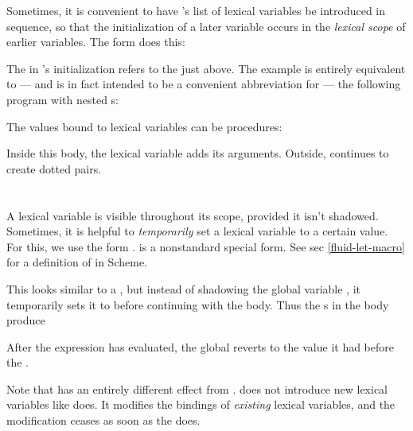 Sometimes, it is convenient to have 's list of
lexical variables be introduced in sequence, so that
the initialization of a later variable occurs in the
{\em lexical scope} of earlier variables.   The form
 does this:


\n The  in 's initialization refers to the 
just above.  The example is entirely equivalent to ---
and is in fact intended to be a convenient abbreviation
for --- the following program with nested s:


The values bound to lexical variables can be
procedures:


\n Inside this  body, the lexical variable 
adds its arguments.   Outside,  continues to
create dotted pairs.


\section{}
\label{fluid-let}

A lexical variable is visible throughout its scope,
provided it isn't shadowed.  Sometimes, it is helpful
to {\em temporarily} set a lexical variable to a
certain value.  For this, we use the form
.\f{ is a nonstandard special
form.  See sec \ref{fluid-let-macro} for a definition
of  in Scheme.}


\n
This looks similar to a , but instead of
shadowing the global variable , it
temporarily sets it to  before continuing with
the
 body.  Thus the s in the body
produce


\n After the  expression has evaluated,
the global  reverts to the value it had
before the .


Note that  has an entirely different
effect from .   does not introduce
new lexical variables like  does.  It modifies
the bindings of {\em existing} lexical variables, and
the modification ceases as soon as the  does.

